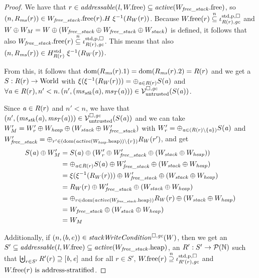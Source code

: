 \begin{proof}
  We have that $r \in \addressable{\lin, \pwfree} \subseteq
  \activeReg{\pwfree[W_\var{free\_stack}]}$, so $\npair{R_\ms(r)} \in
  \pwfree[W_\var{free\_stack}](r).H \; \xi^{-1}(R_W(r))$.
  Because $\pwfree(r) \nsubeq \stdreg{R(r),\gc}{\pur}$ and $W\oplus W_M = W \oplus (W_\var{free\_stack} \oplus W_\var{free\_stack} \oplus W_\var{stack})$ is defined, it follows that
  also $\pwfree[W_\var{free\_stack}](r) \nsubeq \stdreg{R(r),\gc}{\pur}$. This
  means that also $\npair{R_\ms(r)} \in
  H^{\mathrm{std}}_{R(r)}\; \xi^{-1}(R_W(r))$.

  From this, it follows that $\dom(R_\ms(r).1) = \dom(R_\ms(r).2) = R(r)$ and we get a $S : R(r) \fun \World$ with $\xi(\xi^{-1}(R_W(r))) = \oplus_{\aaddr \in R(r)} S(\aaddr)$ and $\forall \aaddr \in R(r),n' < n \ldotp \npair[n']{(\ms_\stk(\aaddr),\ms_T(\aaddr))} \in \lrv(S(\aaddr))$.

  Since $\aaddr \in R(r)$ and $n' < n$, we have that $\npair[n']{(\ms_\stk(\aaddr),\ms_T(\aaddr))} \in \lrv(S(\aaddr))$ and
  we can take $W_M' = W_r' \oplus W_{\var{heap}} \oplus (W_{\var{stack}} \oplus W_{\var{free\_stack}}')$ with $W_r' = \oplus_{\aaddr \in (R(r)\setminus \{\aaddr\})} S(\aaddr)$ and $W_\var{free\_stack}' = \oplus_{r' \in (\dom(\activeReg{\pwheap[W_\var{heap}]})\setminus \{r\})} R_W(r')$, and get
  \begin{align*}
    S(\aaddr) \oplus W_M'
    &=S(\aaddr) \oplus (W_r' \oplus W_{\var{free\_stack}}' \oplus (W_{\var{stack}}\oplus W_\var{heap}))\\
    &=
    \oplus_{\aaddr \in R(r)} S(\aaddr) \oplus W_{\var{free\_stack}}' \oplus (W_{\var{stack}}\oplus W_{\var{heap}})\\
    &=
    \xi(\xi^{-1}(R_W(r))) \oplus W_{\var{free\_stack}}' \oplus (W_{\var{stack}} \oplus W_\var{heap})\\
    &=
    R_W(r) \oplus W_{\var{free\_stack}}' \oplus (W_{\var{stack}} \oplus W_\var{heap})\\
    &=
    \oplus_{r \in \dom(\activeReg{\pwheap[W_\var{free\_stack}]})} R_W(r)\oplus (W_{\var{stack}} \oplus W_{\var{heap}})\\
    &=
      W_\var{free\_stack} \oplus (W_{\var{stack}} \oplus W_{\var{heap}})\\
      &= W_M
  \end{align*}

  Additionally, if $\npair{(b,e)}\in\stackWriteCond{W}$, then
  we get an $S'\subseteq \addressable{\lin, \pwfree} \subseteq \activeReg{\pwheap[W_\var{free\_stack}]}$, an $R' : S' \fun \powerset{\nats}$ such that $\biguplus_{r \in S'} R'(r) \supseteq [\baddr,\eaddr]$ and
  for all $r \in S'$, $\pwfree(r) \nsupeq \stdreg{R'(r),\gc}{\pur}$ and
  $\pwfree(r) \text{ is address-stratified}$.


\end{proof}
